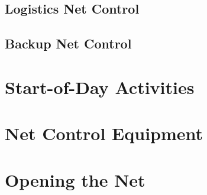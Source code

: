 \documentclass[pdflatex,letterpaper,twoside,12pt]{book}
\begin{document}
\iffalse %
Describe role, types of traffic, etc
\fi

\subsection{Logistics Net Control}

\iffalse %
Describe role, types of traffic, etc
\fi

\subsection{Backup Net Control}

\iffalse %
Describe role, types of traffic, etc
\fi


\section{Start-of-Day Activities}

\iffalse %
Equipment checks, opening script, etc
...and is this the best placement for this section?
\fi


\section{Net Control Equipment}

\iffalse %
going forward things will be 
color coded.... For example. the Medical Repeater will have a red electrical 
tape ring on the antenna, coax, the radios, etc... (or something similar. they 
will also be labeled with Frequency and use ie: Medical 461.800
\fi %


\section{Opening the Net}

\end{document}
